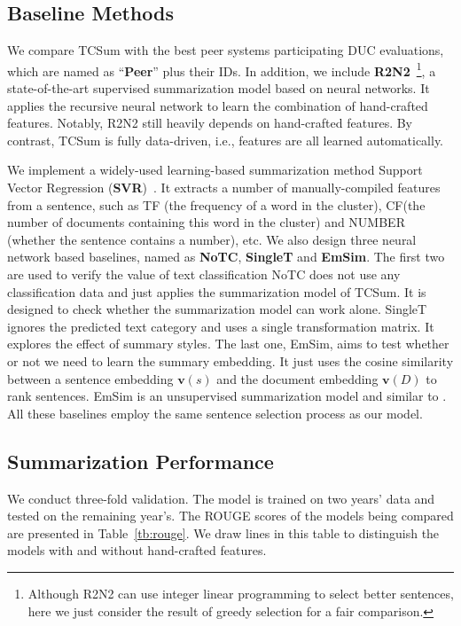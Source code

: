\documentclass[letterpaper]{article}
\begin{document}
\subsection{Baseline Methods} \label{SC:baseline}
We compare TCSum with the best peer systems participating DUC evaluations, which are named as ``\textbf{Peer}'' plus their IDs.
In addition, we include \textbf{R2N2}~\cite{cao2015ranking}\footnote{Although R2N2 can use integer linear programming to select better sentences, here we just consider the result of greedy selection for a fair comparison.}, a state-of-the-art supervised summarization model based on neural networks.
It applies the recursive neural network to learn the combination of hand-crafted features.
Notably, R2N2 still heavily depends on hand-crafted features.
By contrast, TCSum is fully data-driven, i.e., features are all learned automatically.

We implement a widely-used learning-based summarization method Support Vector Regression  (\textbf{SVR})~\cite{li2007multi}.
It extracts a number of manually-compiled features from a sentence, such as TF (the frequency of a word in the cluster), CF(the number of documents containing this word in the cluster) and NUMBER (whether the sentence contains a number), etc.
We also design three neural network based baselines, named as \textbf{NoTC}, \textbf{SingleT} and \textbf{EmSim}.
The first two are used to verify the value of text classification
NoTC does not use any classification data and just applies the summarization model of TCSum.
It is designed to check whether the summarization model can work alone.
SingleT ignores the predicted text category and uses a single transformation matrix.
It explores the effect of summary styles.
The last one, EmSim, aims to test whether or not we need to learn the summary embedding.
It just uses the cosine similarity between a sentence embedding ${\mathbf{v}}(s)$ and the document embedding ${\mathbf{v}}(D)$ to rank sentences.
EmSim is an unsupervised summarization model and similar to \cite{kobayashi-noguchi-yatsuka:2015:EMNLP}.
All these baselines employ the same sentence selection process as our model.

\subsection{Summarization Performance}
We conduct three-fold validation.
The model is trained on two years' data and tested on the remaining year's.
The ROUGE scores of the models being compared are presented in Table~\ref{tb:rouge}.
We draw lines in this table to distinguish the models with and without hand-crafted features.
\end{document}
